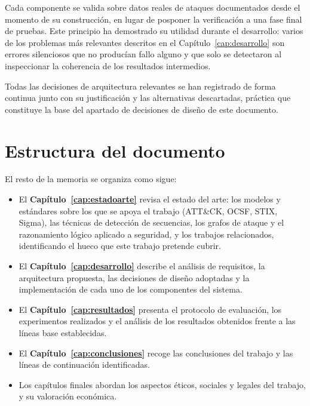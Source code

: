 Cada componente se valida sobre datos reales de ataques documentados desde el momento de su
construcción, en lugar de posponer la verificación a una fase final de pruebas. Este
principio ha demostrado su utilidad durante el desarrollo: varios de los problemas más
relevantes descritos en el Capítulo~\ref{cap:desarrollo} son errores silenciosos que no
producían fallo alguno y que solo se detectaron al inspeccionar la coherencia de los
resultados intermedios.

Todas las decisiones de arquitectura relevantes se han registrado de forma continua junto
con su justificación y las alternativas descartadas, práctica que constituye la base del
apartado de decisiones de diseño de este documento.

\section{Estructura del documento}

El resto de la memoria se organiza como sigue:

\begin{itemize}
    \item El \textbf{Capítulo~\ref{cap:estadoarte}} revisa el estado del arte: los modelos y
    estándares sobre los que se apoya el trabajo (ATT\&CK, OCSF, STIX, Sigma), las técnicas
    de detección de secuencias, los grafos de ataque y el razonamiento lógico aplicado a
    seguridad, y los trabajos relacionados, identificando el hueco que este trabajo pretende
    cubrir.

    \item El \textbf{Capítulo~\ref{cap:desarrollo}} describe el análisis de requisitos, la
    arquitectura propuesta, las decisiones de diseño adoptadas y la implementación de cada
    uno de los componentes del sistema.

    \item El \textbf{Capítulo~\ref{cap:resultados}} presenta el protocolo de evaluación, los
    experimentos realizados y el análisis de los resultados obtenidos frente a las líneas
    base establecidas.

    \item El \textbf{Capítulo~\ref{cap:conclusiones}} recoge las conclusiones del trabajo y
    las líneas de continuación identificadas.

    \item Los capítulos finales abordan los aspectos éticos, sociales y legales del trabajo,
    y su valoración económica.
\end{itemize}
